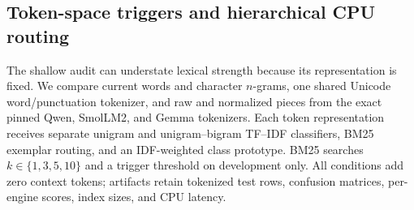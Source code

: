 \documentclass[10pt]{article}
\begin{document}
\subsection{Token-space triggers and hierarchical CPU routing}

The shallow audit can understate lexical strength because its representation is
fixed. We compare current words and character $n$-grams, one shared Unicode
word/punctuation tokenizer, and raw and normalized pieces from the exact pinned
Qwen, SmolLM2, and Gemma tokenizers. Each token representation receives separate
unigram and unigram--bigram TF--IDF classifiers, BM25 exemplar routing, and an
IDF-weighted class prototype. BM25 searches $k\in\{1,3,5,10\}$ and a trigger
threshold on development only. All conditions add zero context tokens;
artifacts retain tokenized test rows, confusion matrices, per-engine scores,
index sizes, and CPU latency.

\begin{table}[ht]
\centering\scriptsize
\caption{Tokenizer-aware six-way test results on the same 900 rows. Acc.=all-row
accuracy, Sel.=positive engine identity, FAR=control activation, Run.=positive
runtime exactness. Latency includes representation and CPU routing.}
\label{tab:tokenizer-ladder}
\end{table}
\end{document}
